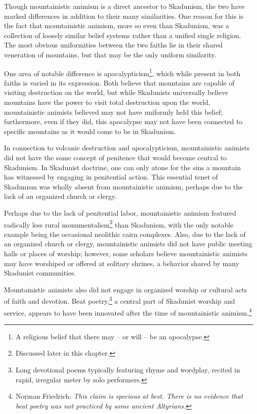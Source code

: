 Though mountainistic animism is a direct ancestor to Skadunism, the two have marked differences in addition to their many similarities. One reason for this is the fact that mountainistic animism, more so even than Skadunism, was a collection of loosely similar belief systems rather than a unified single religion. The most obvious uniformities between the two faiths lie in their shared veneration of mountains, but that may be the only uniform similarity. \par 

One area of notable difference is apocalypticism\footnote{A religious belief that there may -- or will -- be an apocalypse.}, which while present in both faiths is varied in its expression. Both believe that mountains are capable of visiting destruction on the world, but while Skadunists universally believe mountains have the power to visit total destruction upon the world, mountainistic animists believed may not have uniformly held this belief; furthermore, even if they did, this apocalypse may not have been connected to specific mountains as it would come to be in Skadunism.\par 

In connection to volcanic destruction and apocalypticism, mountainistic animists did not have the same concept of penitence that would become central to Skadunism. In Skadunist doctrine, one can only atone for the sins a mountain has witnessed by engaging in penitential action. This essential tenet of Skadunism was wholly absent from mountainistic animism, perhaps due to the lack of an organized church or clergy.\par 

Perhaps due to the lack of penitential labor, mountainistic animism featured radically less rural monumentalism\footnote{Discussed later in this chapter.} than Skadunism, with the only notable example being the occasional neolithic cairn complexes. Also, due to the lack of an organized church or clergy, mountainistic animists did not have public meeting halls or places of worship; however, some scholars believe mountainistic animists may have worshiped or offered at solitary shrines, a behavior shared by many Skadunist communities.\par 

Mountainistic animists also did not engage in organized worship or cultural acts of faith and devotion. Beat poetry,\footnote{Long devotional poems typically featuring rhyme and wordplay, recited in rapid, irregular meter by solo performers.} a central part of Skadunist worship and service, appears to have been innovated after the time of mountainistic animism.\footnote{Norman Friedrich: \textit{This claim is specious at best. There is no evidence that beat poetry was not practiced by some ancient Altyrians.}}

